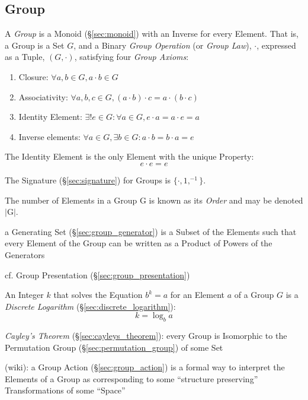 


\subsection{Group}\label{sec:group}

A \emph{Group} is a Monoid (\S\ref{sec:monoid}) with an Inverse for every
Element. That is, a Group is a Set $G$, and a Binary \emph{Group Operation} (or
\emph{Group Law}), $\cdot$, expressed as a Tuple, $(G,\cdot)$, satisfying four
\emph{Group Axioms}:
\begin{enumerate}
  \item Closure: $\forall a,b \in G, a \cdot b \in G$
  \item Associativity: $\forall a,b,c \in G, (a \cdot b) \cdot c = a
    \cdot (b \cdot c)$
  \item Identity Element: $\exists! e \in G : \forall a \in G,
    e \cdot a = a \cdot e = a$
  \item Inverse elements: $\forall a \in G, \exists b \in G :
    a \cdot b = b \cdot a = e$
\end{enumerate}
The Identity Element is the only Element with the unique Property:
\[
  e \cdot e = e
\]

The Signature (\S\ref{sec:signature}) for Groups is $\{\cdot, 1, ^{-1}\}$.

The number of Elements in a Group $\mathrm{G}$ is known as its \emph{Order} and
may be denoted $|\mathrm{G}|$.

a Generating Set (\S\ref{sec:group_generator}) is a Subset of the Elements such
that every Element of the Group can be written as a Product of Powers of the
Generators

\fist cf. Group Presentation (\S\ref{sec:group_presentation})

An Integer $k$ that solves the Equation $b^k = a$ for an Element $a$ of a Group
$G$ is a \emph{Discrete Logarithm} (\S\ref{sec:discrete_logarithm}):
\[
  k = \log_b a
\]

\emph{Cayley's Theorem} (\S\ref{sec:cayleys_theorem}): every Group is Isomorphic
to the Permutation Group (\S\ref{sec:permutation_group}) of some Set

(wiki): a Group Action (\S\ref{sec:group_action}) is a formal way to interpret
the Elements of a Group as corresponding to some ``structure preserving''
Transformations of some ``Space''

